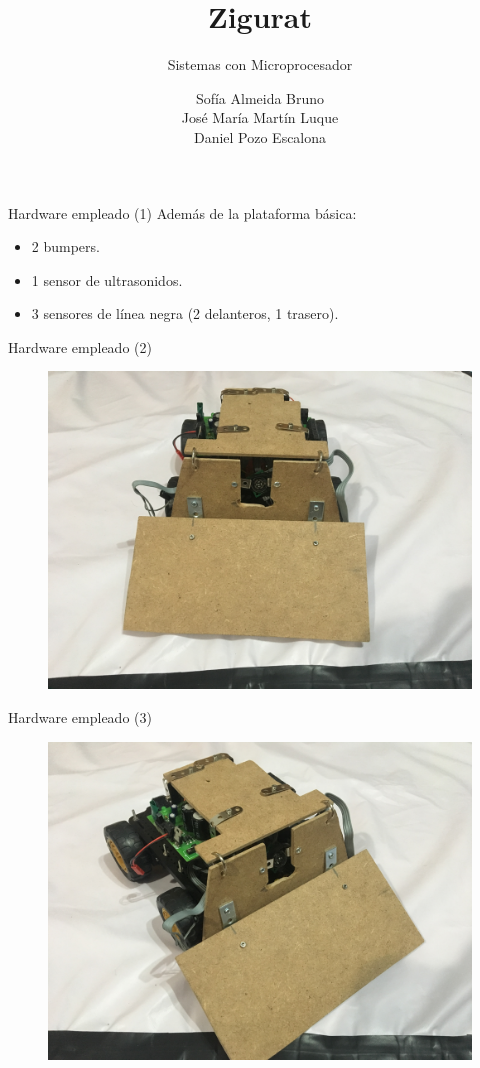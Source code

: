 \documentclass[spanish]{beamer}
\title{Zigurat}
\subtitle{Sistemas con Microprocesador}
\author{Sofía Almeida Bruno\\ José María Martín Luque\\Daniel Pozo Escalona\\ \vspace{1em}}
\begin{document}
\maketitle

\begin{frame}{Hardware empleado (1)}
  Además de la plataforma básica:
  \begin{itemize}
    \item 2 bumpers.
    \item 1 sensor de ultrasonidos.
    \item 3 sensores de línea negra (2 delanteros, 1 trasero).
  \end{itemize}
\end{frame}

\begin{frame}{Hardware empleado (2)}
  \begin{figure}
    \includegraphics[scale=0.07]{./img/zigurat1}
    \end{figure}
\end{frame}

\begin{frame}{Hardware empleado (3)}
  \begin{figure}
    \includegraphics[scale=0.07]{./img/zigurat2}
    \end{figure}
\end{frame}
\end{document}
